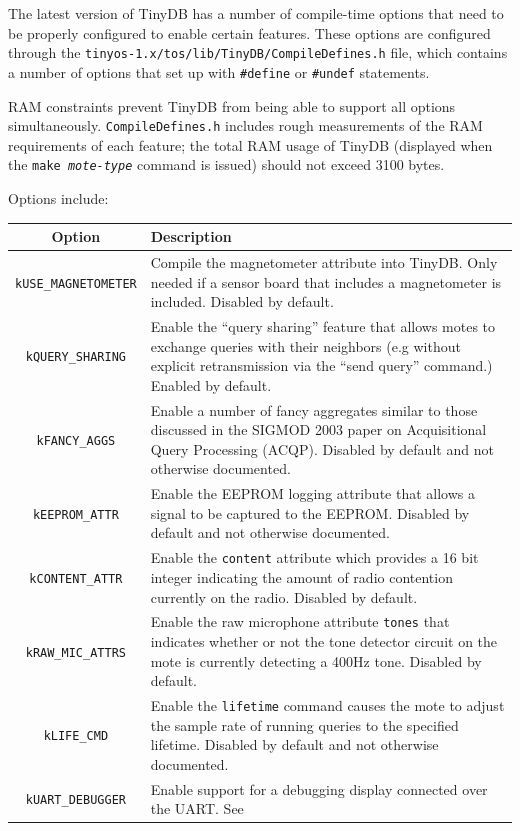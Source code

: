 \documentclass[11pt]{article}
\newcommand{\docroot}{tinyos-1.x}
\begin{document}
The latest version of TinyDB has a number of compile-time options that need to be
properly configured to enable certain features.  These options are configured through
the {\tt \docroot/tos/lib/TinyDB/CompileDefines.h} file, which contains a number of 
options that set up with {\tt \#define} or {\tt \#undef} statements. 

RAM constraints prevent TinyDB from being able to support all options simultaneously.
{\tt CompileDefines.h} includes rough measurements of the RAM requirements of each feature;
the total RAM usage of TinyDB (displayed when the {\tt make {\it mote-type}} command is issued)
should not exceed 3100 bytes.

 Options include:

\begin{tabularx}{6in}{|c|X|}
\hline
Option & Description \\
\hline
{\tt kUSE\_MAGNETOMETER}& Compile the magnetometer attribute into TinyDB. Only needed if
  a sensor board that includes a magnetometer is included.  Disabled by default. \\
{\tt kQUERY\_SHARING}& Enable the ``query sharing'' feature that allows motes to exchange queries
with their neighbors (e.g without explicit retransmission via the ``send query'' command.)
Enabled by default. \\
{\tt kFANCY\_AGGS}& Enable a number of fancy aggregates similar to those discussed in the SIGMOD
2003 paper on Acquisitional Query Processing (ACQP). Disabled by default and not otherwise
documented. \\
{\tt kEEPROM\_ATTR}& Enable the EEPROM logging attribute that allows a signal to be captured to
the EEPROM. Disabled by default and not otherwise documented. \\
{\tt kCONTENT\_ATTR}&  Enable the {\tt content} attribute which provides a 16 bit integer indicating
the amount of radio contention currently on the radio.  Disabled by default. \\
{\tt kRAW\_MIC\_ATTRS}&  Enable the raw microphone attribute {\tt tones} that indicates whether or
not the tone detector circuit on the mote is currently detecting a 400Hz tone.  Disabled
by default. \\
{\tt kLIFE\_CMD}& Enable the {\tt lifetime} command causes the mote to adjust the sample
rate of running queries to the specified lifetime.  Disabled by default and not otherwise
documented. \\
{\tt kUART\_DEBUGGER}&  Enable support for a debugging display connected over the UART.  See

\end{tabularx}
\end{document}
